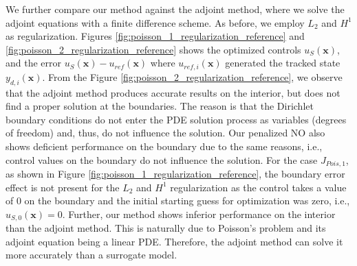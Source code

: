 \documentclass[final,1p,times]{elsarticle}
\theoremstyle{plain} %
\theoremstyle{definition} %
\theoremstyle{remark} %
\begin{document}
We further compare our method against the adjoint method, where we solve the adjoint equations with a finite difference scheme. As before, we employ  $L_2$ and $H^1$ as regularization. Figures \ref{fig:poisson_1_regularization_reference} and \ref{fig:poisson_2_regularization_reference} shows the optimized controls $u_S(\mathbf{x})$, and the error $u_S(\mathbf{x})-u_{ref}(\mathbf{x})$ where $u_{ref,i}(\mathbf{x})$ generated the tracked state $y_{d,i}(\mathbf{x})$. From the Figure \ref{fig:poisson_2_regularization_reference}, we observe that the adjoint method produces accurate results on the interior, but does not find a proper solution at the boundaries. The reason is that the Dirichlet boundary conditions do not enter the PDE solution process as variables (degrees of freedom) and, thus, do not influence the solution. Our penalized NO also shows deficient performance on the boundary due to the same reasons, i.e., control values on the boundary do not influence the solution. For the case $J_{Pois,1}$, as shown in Figure \ref{fig:poisson_1_regularization_reference}, the boundary error effect is not present for the $L_2$ and $H^1$ regularization as the control takes a value of 0 on the boundary and the initial starting guess for optimization was zero, i.e., $u_{S,0}(\mathbf{x})=0$. Further, our method shows inferior performance on the interior than the adjoint method. This is naturally due to Poisson's problem and its adjoint equation being a linear PDE. Therefore, the adjoint method can solve it more accurately than a surrogate model. 
\end{document}

